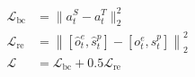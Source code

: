 \documentclass[border=7pt]{standalone}
\begin{document}
\color{ink}
$\displaystyle \begin{aligned}\mathcal L_{\mathrm{bc}}&=\lVert a_t^S-a_t^T\rVert_2^2\\\mathcal L_{\mathrm{re}}&=\left\lVert[\widehat o_t^e,\widehat s_t^p]-[o_t^e,s_t^p]\right\rVert_2^2\\\mathcal L&=\mathcal L_{\mathrm{bc}}+0.5\mathcal L_{\mathrm{re}}\end{aligned}$
\end{document}
